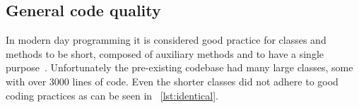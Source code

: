 \subsection{General code quality}
In modern day programming it is considered good practice for classes and methods to be short, composed of auxiliary methods and to have a single purpose~\cite{so_can_a_function_be_too_short}. Unfortunately the pre-existing codebase had many large classes, some with over 3000 lines of code. Even the shorter classes did not adhere to good coding practices as can be seen in ~\cref{lst:identical}.

